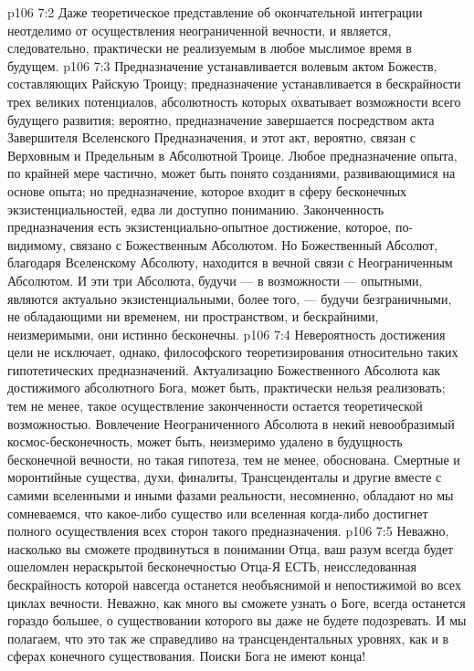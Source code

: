 \vs p106 7:2 Даже теоретическое представление об окончательной интеграции неотделимо от осуществления неограниченной вечности, и является, следовательно, практически не реализуемым в любое мыслимое время в будущем.
\vs p106 7:3 \pc Предназначение устанавливается волевым актом Божеств, составляющих Райскую Троицу; предназначение устанавливается в бескрайности трех великих потенциалов, абсолютность которых охватывает возможности всего будущего развития; вероятно, предназначение завершается посредством акта Завершителя Вселенского Предназначения, и этот акт, вероятно, связан с Верховным и Предельным в Абсолютной Троице. Любое предназначение опыта, по крайней мере частично, может быть понято созданиями, развивающимися на основе опыта; но предназначение, которое входит в сферу бесконечных экзистенциальностей, едва ли доступно пониманию. Законченность предназначения есть экзистенциально\hyp{}опытное достижение, которое, по\hyp{}видимому, связано с Божественным Абсолютом. Но Божественный Абсолют, благодаря Вселенскому Абсолюту, находится в вечной связи с Неограниченным Абсолютом. И эти три Абсолюта, будучи --- в возможности --- опытными, являются актуально экзистенциальными, более того, --- будучи безграничными, не обладающими ни временем, ни пространством, и бескрайними, неизмеримыми, они истинно бесконечны.
\vs p106 7:4 Невероятность достижения цели не исключает, однако, философского теоретизирования относительно таких гипотетических предназначений. Актуализацию Божественного Абсолюта как достижимого абсолютного Бога, может быть, практически нельзя реализовать; тем не менее, такое осуществление законченности остается теоретической возможностью. Вовлечение Неограниченного Абсолюта в некий невообразимый космос\hyp{}бесконечность, может быть, неизмеримо удалено в будущность бесконечной вечности, но такая гипотеза, тем не менее, обоснована. Смертные и моронтийные существа, духи, финалиты, Трансценденталы и другие вместе с самими вселенными и иными фазами реальности, несомненно, обладают   но мы сомневаемся, что какое\hyp{}либо существо или вселенная когда\hyp{}либо достигнет полного осуществления всех сторон такого предназначения.
\vs p106 7:5 \pc Неважно, насколько вы сможете продвинуться в понимании Отца, ваш разум всегда будет ошеломлен нераскрытой бесконечностью Отца\hyp{}Я ЕСТЬ, неисследованная бескрайность которой навсегда останется необъяснимой и непостижимой во всех циклах вечности. Неважно, как много вы сможете узнать о Боге, всегда останется гораздо большее, о существовании которого вы даже не будете подозревать. И мы полагаем, что это так же справедливо на трансцендентальных уровнях, как и в сферах конечного существования. Поиски Бога не имеют конца!
